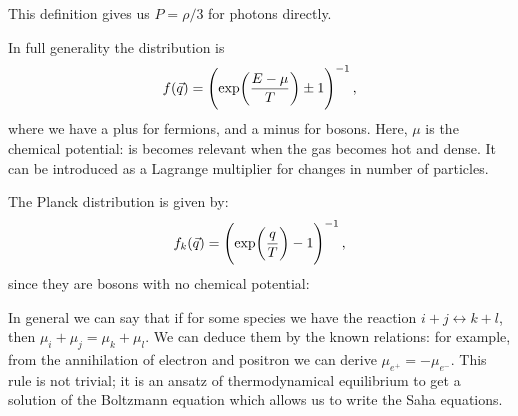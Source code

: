 \documentclass[main.tex]{subfiles}
\begin{document}
This definition gives us \(P = \rho /3\) for photons directly.

In full generality the distribution is 
%
\begin{equation}
  f(\vec{q}) = \qty(\exp(\frac{E- \mu }{T}) \pm 1 )^{-1}
\,,
\end{equation}
%
where we have a plus for fermions, and a minus for bosons. Here, \(\mu \) is the chemical potential: is becomes relevant when the gas becomes hot and dense.
It can be introduced as a Lagrange multiplier for changes in number of particles.

The Planck distribution is given by: 
%
\begin{equation}
  f_k(\vec{q}) = \qty(\exp(\frac{q}{T}) -1 )^{-1}
\,,
\end{equation}
%
since they are bosons with no chemical potential:

In general we can say that if for some species we have the reaction \(i+j \leftrightarrow k+l\), then \(\mu _i + \mu _j = \mu _k + \mu _l\). We can deduce them by the known relations: for example, from the annihilation of electron and positron we can derive \(\mu _{e^{+}} = - \mu_{e^{-}}\).
This rule is not trivial; it is an ansatz of thermodynamical equilibrium to get a solution of the Boltzmann equation which allows us to write the Saha equations.
\end{document}
